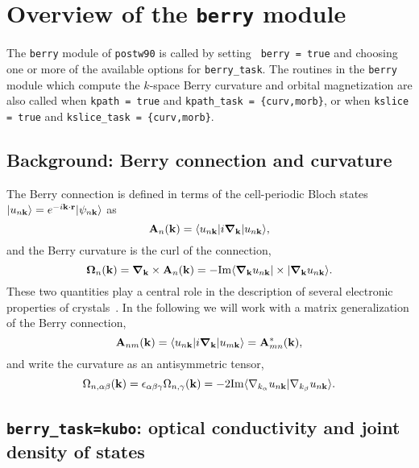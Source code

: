 \chapter{Overview of the {\tt berry} module}
\label{ch:berry}

The {\tt berry} module of {\tt postw90} is called by setting {\tt
  berry = true} and choosing one or more of the available options for
{\tt berry\_task}. The routines in the {\tt berry} module which
compute the $k$-space Berry curvature and orbital magnetization are
also called when {\tt kpath = true} and {\tt kpath\_task = \{curv,morb\}},
or when {\tt kslice = true} and {\tt kslice\_task = \{curv,morb\}}.

\section{Background: Berry connection and curvature}

The Berry connection is defined in terms of the cell-periodic Bloch
states $\vert u_{n{\bf k}}\rangle=e^{-i{\bf k}\cdot{\bf r}}\vert
\psi_{n{\bf k}}\rangle$ as
%
\begin{equation}
{\bf A}_n({\bf k})=\langle u_{n{\bf k}}\vert i\bm{\nabla}_{\bf k}\vert
u_{n{\bf k}}\rangle,
\end{equation}
%
and the Berry curvature is the curl of the connection,
%
\begin{equation}
\bm{\Omega}_n({\bf k})=\bm{\nabla}_{\bf k}\times {\bf A}_n({\bf k})=
-{\rm Im}
\langle \bm{\nabla}_{\bf k} u_{n{\bf k}}\vert \times
\vert\bm{\nabla}_{\bf k} u_{n{\bf k}}\rangle.
\end{equation}
%
These two quantities play a central role in the description of several
electronic properties of crystals~\cite{xiao-rmp10}.  In the following
we will work with a matrix generalization of the Berry connection,
%
\begin{equation}
{\bf A}_{nm}({\bf k})=\langle u_{n{\bf k}}\vert i\bm{\nabla}_{\bf k}\vert
u_{m{\bf k}}\rangle={\bf A}_{mn}^*({\bf k}),
\end{equation}
%
and write the curvature as an antisymmetric tensor,
%
\begin{equation}
\label{eq:curv}
\Omega_{n,\alpha\beta}({\bf k}) =\epsilon_{\alpha\beta\gamma}
\Omega_{n,\gamma}({\bf k})=-2{\rm Im}\langle 
\nabla_{k_\alpha} u_{n\bf k}\vert \nabla_{k_\beta} u_{n\bf k}\rangle.
\end{equation}

\section{{\tt berry\_task=kubo}: optical conductivity and joint
  density of states }

